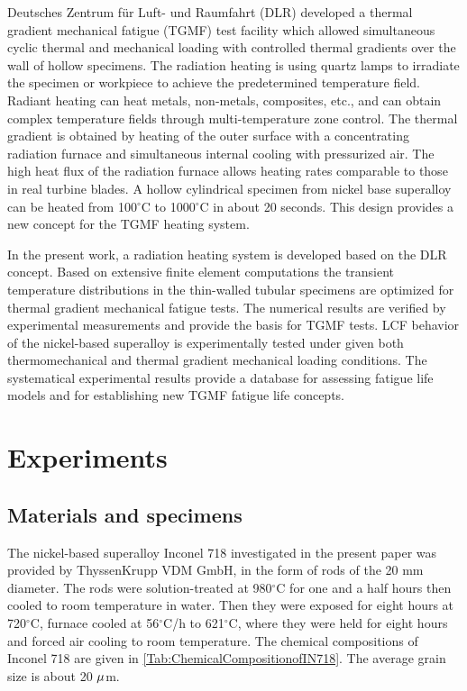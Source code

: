 \documentclass[preprint,5p,twocolumn,10pt,sort&compress]{elsarticle}
\begin{document}
Deutsches Zentrum f\"{u}r Luft- und Raumfahrt (DLR) \cite{BARTSCH2008211, BAUFELD2008219} developed a thermal gradient mechanical fatigue (TGMF) test facility which allowed simultaneous cyclic thermal and mechanical loading with controlled thermal gradients over the wall of hollow specimens. 
The radiation heating is using quartz lamps to irradiate the specimen or workpiece to achieve the predetermined temperature field. Radiant heating can heat metals, non-metals, composites, etc., and can obtain complex temperature fields through multi-temperature zone control.
The thermal gradient is obtained by heating of the outer surface with a concentrating radiation furnace and simultaneous internal cooling with pressurized air. The high heat flux of the radiation furnace allows heating rates comparable to those in real turbine blades.  A hollow cylindrical specimen from nickel base superalloy can be heated from 100$^\circ$C to 1000$^\circ$C in about 20 seconds. This design provides a new concept for the TGMF heating system.

In the present work, a radiation heating system is developed based on the DLR concept. Based on extensive finite element computations the transient temperature distributions in the thin-walled tubular specimens are optimized for thermal gradient mechanical fatigue tests. The numerical results are verified by experimental measurements and provide the basis for TGMF tests. LCF behavior of the nickel-based superalloy is experimentally tested under given both thermomechanical and thermal gradient mechanical loading conditions. The systematical experimental results provide a database for assessing fatigue life models and for establishing new TGMF fatigue life concepts. 

\section{Experiments}

\subsection{Materials and specimens}
The nickel-based superalloy Inconel 718 investigated in the present paper was provided by ThyssenKrupp VDM GmbH, in the form of rods of the 20 mm diameter.
The rods were solution-treated at 980$^{\circ}$C for one and a half hours then cooled to room temperature in water.
Then they were exposed for eight hours at 720$^{\circ}$C, furnace cooled at 56$^{\circ}$C/h to 621$^{\circ}$C, where they were held for eight hours and forced air cooling to room temperature.
The chemical compositions of Inconel 718 are given in \autoref{Tab:ChemicalCompositionofIN718}.
The average grain size is about 20 $\rm{\mu }$m.
\end{document}
